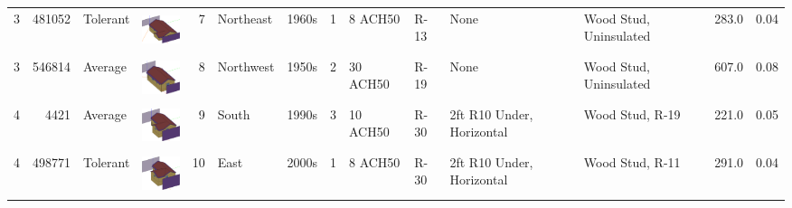 \begin{tabular}{rrllrlllllllrr}
 3 & 481052 & Tolerant & {\includegraphics[height=0.45in]{figures/building_geometry/481052}} & 7 & Northeast & 1960s & 1 & 8 ACH50 & R-13 & None & Wood Stud, Uninsulated & 283.0 & 0.04 \\
 3 & 546814 & Average & {\includegraphics[height=0.45in]{figures/building_geometry/546814}} & 8 & Northwest & 1950s & 2 & 30 ACH50 & R-19 & None & Wood Stud, Uninsulated & 607.0 & 0.08 \\
 4 & 4421 & Average & {\includegraphics[height=0.45in]{figures/building_geometry/4421}} & 9 & South & 1990s & 3 & 10 ACH50 & R-30 & 2ft R10 Under, Horizontal & Wood Stud, R-19 & 221.0 & 0.05 \\
 4 & 498771 & Tolerant & {\includegraphics[height=0.45in]{figures/building_geometry/498771}} & 10 & East & 2000s & 1 & 8 ACH50 & R-30 & 2ft R10 Under, Horizontal & Wood Stud, R-11 & 291.0 & 0.04 \\
\bottomrule
\end{tabular}
